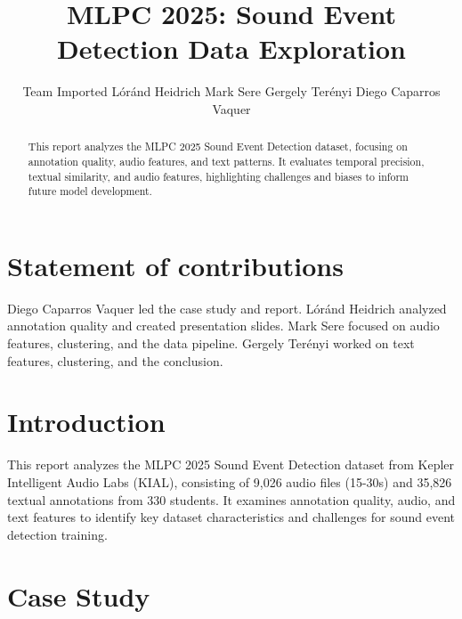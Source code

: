 \documentclass{article}
\title{MLPC 2025: Sound Event Detection Data Exploration}
\author{
  Team Imported \AND
  Lóránd Heidrich
  \And
  Mark Sere
  \And 
  Gergely Terényi
  \And 
  Diego Caparros Vaquer
}
\begin{document}
\maketitle
\section{Statement of contributions}
Diego Caparros Vaquer led the case study and report. Lóránd Heidrich analyzed annotation quality and created presentation slides. Mark Sere focused on audio features, clustering, and the data pipeline. Gergely Terényi worked on text features, clustering, and the conclusion.

\begin{abstract}
This report analyzes the MLPC 2025 Sound Event Detection dataset, focusing on annotation quality, audio features, and text patterns. It evaluates temporal precision, textual similarity, and audio features, highlighting challenges and biases to inform future model development.
\end{abstract}

\section{Introduction}

This report analyzes the MLPC 2025 Sound Event Detection dataset from Kepler Intelligent Audio Labs (KIAL), consisting of 9,026 audio files (15-30s) and 35,826 textual annotations from 330 students. It examines annotation quality, audio, and text features to identify key dataset characteristics and challenges for sound event detection training.

\section{Case Study}
\label{sec:case_study}

\begin{table}[H]
  \caption{Conclusions}
  \label{tab:text_similarity}
  \centering
\end{table}
\end{document}
